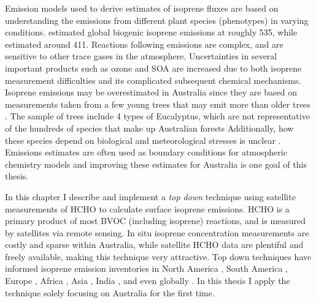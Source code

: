   Emission models used to derive estimates of isoprene fluxes are based on understanding the emissions from different plant species (phenotypes) in varying conditions.
  \textcite{Guenther2012} estimated global biogenic isoprene emissions at roughly 535\tgpyr, while \textcite{Sindelarova2014} estimated around 411\tgpyr.
  Reactions following emissions are complex, and are sensitive to other trace gases in the atmosphere.
  Uncertainties in several important products such as ozone and SOA are increased due to both isoprene measurement difficulties and its complicated subsequent chemical mechanisms.
  Isoprene emissions may be overestimated in Australia since they are based on measurements taken from a few young trees \parencite{Winters2009} that may emit more than older trees \parencite{Emmerson2016}.
  The sample of trees include 4 types of Eucalyptus, which are not representative of the hundreds of species that make up Australian forests
  Additionally, how these species depend on biological and meteorological stresses is unclear \parencite{Winters2009, FortemsCheiney2012}.
  Emissions estimates are often used as boundary conditions for atmospheric chemistry models and improving these estimates for Australia is one goal of this thesis.
  
  
  In this chapter I describe and implement a \textit{top down} technique using satellite measurements of HCHO to calculate surface isoprene emissions.
  HCHO is a primary product of most BVOC (including isoprene) reactions, and is measured by satellites via remote sensing.
  In situ isoprene concentration measurements are costly and sparse within Australia, while satellite HCHO data are plentiful and freely available, making this technique very attractive.
  Top down techniques have informed isoprene emission inventories in North America \parencite{Abbot2003,Palmer2003,Palmer2006,Millet2006,Millet2008}, South America \parencite{Barkley2013}, Europe \parencite{Dufour2009,Curci2010}, Africa \parencite{Marais2012}, Asia \parencite{Fu2007,Stavrakou2014}, India \parencite{Surl2018}, and even globally \parencite{Shim2005,FortemsCheiney2012,Bauwens2016}.
  In this thesis I apply the technique solely focusing on Australia for the first time.
  
